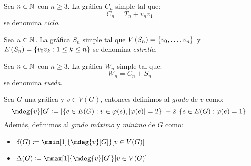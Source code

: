 \begin{definition}[Ciclo]
	Sea $n\in\mathbb{N}^{}$ con $n\geq 3$. La gráfica $C_{n}$ simple tal que:
	\[ C_{n} = T_{n} + v_{n}v_{1} \]
	se denomina \emph{ciclo}.
\end{definition}
\begin{figure}[H]
	\centering
\end{figure}
\begin{definition}[Estrella]
	Sea $n\in\mathbb{N}^{}$. La gráfica $S_{n}$ simple tal que $V\left( S_{n} \right) =\left\{ v_{0},\dotsc, v_{n} \right\}$ y $E\left( S_{n} \right) =\left\{ v_{0}v_{k}: 1\leq k\leq n \right\}$ se denomina \emph{estrella}.
\end{definition}
\begin{figure}[H]
	\centering
\end{figure}
\begin{definition}[Rueda]
	Sea $n\in\mathbb{N}^{}$ con $n\geq 3$. La gráfica $W_{n}$ simple tal que:
	\[ W_{n} = C_{n} + S_{n} \]
	se denomina \emph{rueda}.
\end{definition}
\begin{figure}[H]
	\centering
\end{figure}
\begin{definition}
	Sea $G$ una gráfica y $v\in V(G)$, entonces definimos al \emph{grado} de $v$ como:
	\[ \mdeg{v}[G]\coloneqq\abs{\set{e\in E(G): v\in\varphi(e),\abs{\varphi(e)} = 2}} + 2\abs{\set{e\in E(G):\varphi(e) = 1}} \]
	Además, definimos al \emph{grado máximo} y \emph{mínimo} de $G$ como:
	\begin{itemize}
		\item $\ds\delta(G)\coloneqq\mmin[1]{\mdeg{v}[G]}[v\in V(G)]$
		\item $\ds\Delta(G)\coloneqq\mmax[1]{\mdeg{v}[G]}[v\in V(G)]$
	\end{itemize}
\end{definition}
